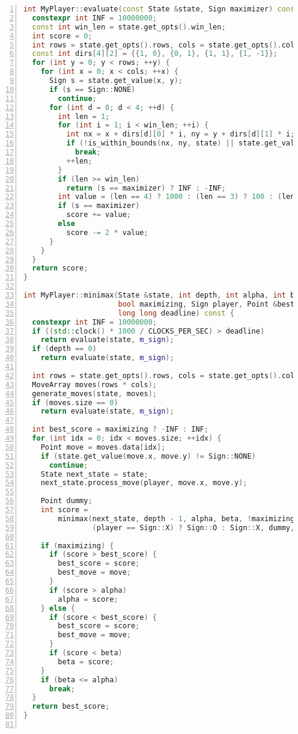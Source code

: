 \begin{lstlisting}[language=C++,caption={Реализация класса MyPlayer},label={lst:move_array},numbers=left]
int MyPlayer::evaluate(const State &state, Sign maximizer) const {
  constexpr int INF = 10000000;
  const int win_len = state.get_opts().win_len;
  int score = 0;
  int rows = state.get_opts().rows, cols = state.get_opts().cols;
  const int dirs[4][2] = {{1, 0}, {0, 1}, {1, 1}, {1, -1}};
  for (int y = 0; y < rows; ++y) {
    for (int x = 0; x < cols; ++x) {
      Sign s = state.get_value(x, y);
      if (s == Sign::NONE)
        continue;
      for (int d = 0; d < 4; ++d) {
        int len = 1;
        for (int i = 1; i < win_len; ++i) {
          int nx = x + dirs[d][0] * i, ny = y + dirs[d][1] * i;
          if (!is_within_bounds(nx, ny, state) || state.get_value(nx, ny) != s)
            break;
          ++len;
        }
        if (len >= win_len)
          return (s == maximizer) ? INF : -INF;
        int value = (len == 4) ? 1000 : (len == 3) ? 100 : (len == 2) ? 10 : 1;
        if (s == maximizer)
          score += value;
        else
          score -= 2 * value;
      }
    }
  }
  return score;
}

int MyPlayer::minimax(State &state, int depth, int alpha, int beta,
                      bool maximizing, Sign player, Point &best_move,
                      long long deadline) const {
  constexpr int INF = 10000000;
  if ((std::clock() * 1000 / CLOCKS_PER_SEC) > deadline)
    return evaluate(state, m_sign);
  if (depth == 0)
    return evaluate(state, m_sign);

  int rows = state.get_opts().rows, cols = state.get_opts().cols;
  MoveArray moves(rows * cols);
  generate_moves(state, moves);
  if (moves.size == 0)
    return evaluate(state, m_sign);

  int best_score = maximizing ? -INF : INF;
  for (int idx = 0; idx < moves.size; ++idx) {
    Point move = moves.data[idx];
    if (state.get_value(move.x, move.y) != Sign::NONE)
      continue;
    State next_state = state;
    next_state.process_move(player, move.x, move.y);

    Point dummy;
    int score =
        minimax(next_state, depth - 1, alpha, beta, !maximizing,
                (player == Sign::X) ? Sign::O : Sign::X, dummy, deadline);

    if (maximizing) {
      if (score > best_score) {
        best_score = score;
        best_move = move;
      }
      if (score > alpha)
        alpha = score;
    } else {
      if (score < best_score) {
        best_score = score;
        best_move = move;
      }
      if (score < beta)
        beta = score;
    }
    if (beta <= alpha)
      break;
  }
  return best_score;
}


\end{lstlisting}
